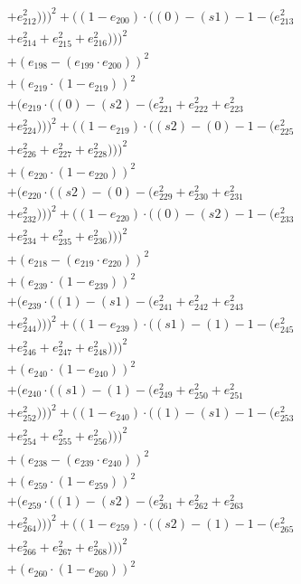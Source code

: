 \documentclass[10pt, a4paper]{article}
\begin{document}
\begin{small}
\begin{align*}
& + e_{212}^{2})))^{2} + ((1 - e_{200})  \cdot  ((0) - (s1) - 1 - (e_{213}^{2} \\
& + e_{214}^{2} + e_{215}^{2} + e_{216}^{2})))^{2} \\
& + (e_{198} - (e_{199}  \cdot  e_{200}))^{2} \\
& + (e_{219}  \cdot  (1 - e_{219}))^{2} \\
& + (e_{219}  \cdot  ((0) - (s2) - (e_{221}^{2} + e_{222}^{2} + e_{223}^{2} \\
& + e_{224}^{2})))^{2} + ((1 - e_{219})  \cdot  ((s2) - (0) - 1 - (e_{225}^{2} \\
& + e_{226}^{2} + e_{227}^{2} + e_{228}^{2})))^{2} \\
& + (e_{220}  \cdot  (1 - e_{220}))^{2} \\
& + (e_{220}  \cdot  ((s2) - (0) - (e_{229}^{2} + e_{230}^{2} + e_{231}^{2} \\
& + e_{232}^{2})))^{2} + ((1 - e_{220})  \cdot  ((0) - (s2) - 1 - (e_{233}^{2} \\
& + e_{234}^{2} + e_{235}^{2} + e_{236}^{2})))^{2} \\
& + (e_{218} - (e_{219}  \cdot  e_{220}))^{2} \\
& + (e_{239}  \cdot  (1 - e_{239}))^{2} \\
& + (e_{239}  \cdot  ((1) - (s1) - (e_{241}^{2} + e_{242}^{2} + e_{243}^{2} \\
& + e_{244}^{2})))^{2} + ((1 - e_{239})  \cdot  ((s1) - (1) - 1 - (e_{245}^{2} \\
& + e_{246}^{2} + e_{247}^{2} + e_{248}^{2})))^{2} \\
& + (e_{240}  \cdot  (1 - e_{240}))^{2} \\
& + (e_{240}  \cdot  ((s1) - (1) - (e_{249}^{2} + e_{250}^{2} + e_{251}^{2} \\
& + e_{252}^{2})))^{2} + ((1 - e_{240})  \cdot  ((1) - (s1) - 1 - (e_{253}^{2} \\
& + e_{254}^{2} + e_{255}^{2} + e_{256}^{2})))^{2} \\
& + (e_{238} - (e_{239}  \cdot  e_{240}))^{2} \\
& + (e_{259}  \cdot  (1 - e_{259}))^{2} \\
& + (e_{259}  \cdot  ((1) - (s2) - (e_{261}^{2} + e_{262}^{2} + e_{263}^{2} \\
& + e_{264}^{2})))^{2} + ((1 - e_{259})  \cdot  ((s2) - (1) - 1 - (e_{265}^{2} \\
& + e_{266}^{2} + e_{267}^{2} + e_{268}^{2})))^{2} \\
& + (e_{260}  \cdot  (1 - e_{260}))^{2} \\

\end{align*}
\end{small}
\end{document}
